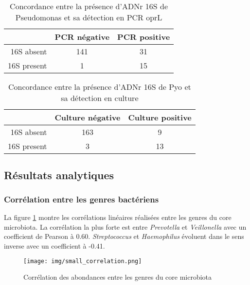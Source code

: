 \documentclass[12pt,a4paper]{article}
\begin{document}
  \begin{table}[!h]
      \centering
      \begin{tabular}{r|c|c}
           & PCR négative  & PCR positive \\
           \hline
           16S absent & 141 & 31 \\
           16S present & 1 & 15   \\

      \end{tabular}
      \caption{Concordance entre la présence d'ADNr 16S de Pseudomonas et sa détection en PCR oprL}
      \label{pyopcr}
  \end{table}

  \begin{table}[!h]
      \centering
      \begin{tabular}{r|c|c}
           & Culture négative  & Culture positive \\
           \hline
           16S absent & 163 & 9 \\
           16S present & 3 & 13   \\
      \end{tabular}
      \caption{Concordance entre la présence d'ADNr 16S de Pyo et sa détection en culture}
      \label{pyoculture}
  \end{table}


\subsection{Résultats analytiques}
\subsubsection{Corrélation entre les genres bactériens}
La figure \ref{correlation} montre les corrélations linéaires réalisées entre les genres du core microbiota. La corrélation la plus forte est entre \textit{Prevotella} et \textit{Veillonella} avec un coefficient de Pearson à 0.60.  \textit{Streptococcus} et \textit{Haemophilus} évoluent dans le sens inverse avec un coefficient à -0.41.


\begin{figure}
\begin{center}
\texttt{[image: img/small\_correlation.png]}\hfill
\end{center}
\caption{Corrélation des abondances entre les genres du core microbiota}
\label{correlation}
\end{figure}
\end{document}
